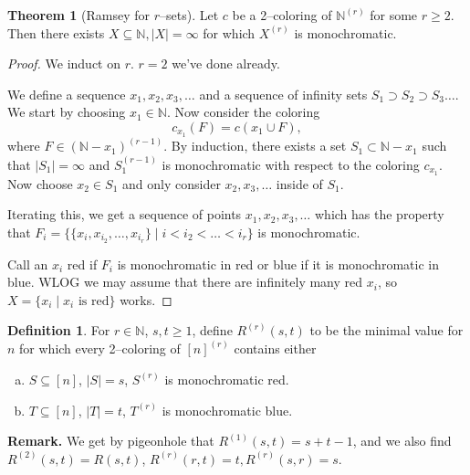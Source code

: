 \documentclass{article}
\theoremstyle{definition}
\newtheorem{theorem}{Theorem}[section]
\newtheorem{defn}{Definition}[section]
\begin{document}
\begin{theorem}[Ramsey for $r$--sets]
    Let $c$ be a 2--coloring of $\mathbb{N}^{(r)}$ for some $r\ge 2.$ Then there exists $X \subseteq \mathbb{N}, |X|=\infty$ for which $X^{(r)}$ is monochromatic.
\end{theorem}
\begin{proof}
    We induct on $r$. $r=2$ we've done already.
    \vspace{1mm}
    
    We define a sequence $x_1,x_2,x_3,\ldots$ and a sequence of infinity sets $S_1 \supset S_2 \supset S_3 \ldots$. We start by choosing $x_1 \in \mathbb{N}$. Now consider the coloring \[
    c_{x_1}(F)=c(x_1 \cup F),
    \] where $F \in (\mathbb{N}-x_1)^{(r-1)}$. By induction, there exists a set $S_1 \subset \mathbb{N}-x_1$ such that $|S_1|=\infty$ and $S_1^{(r-1)}$ is monochromatic with respect to the coloring $c_{x_1}$. Now choose $x_2 \in S_1$ and only consider $x_2,x_3,\ldots$ inside of $S_1$.

    Iterating this, we get a sequence of points $x_1,x_2,x_3,\ldots$ which has the property that $F_i = \{\{x_{i},x_{i_2},\ldots,x_{i_r}\} \mid i < i_2 < \ldots < i_r\}$ is monochromatic.

    Call an $x_i$ red if $F_i$ is monochromatic in red or blue if it is monochromatic in blue. WLOG we may assume that there are infinitely many red $x_i$, so $X = \{x_i \mid x_i \text{ is red}\}$ works.
\end{proof}
\begin{defn}
    For $r \in \mathbb{N}$, $s,t \ge 1$, define $R^{(r)}(s,t)$ to be the minimal value for $n$ for which every 2--coloring of $[n]^{(r)}$ contains either 
    \begin{enumerate}[(a)]
        \item $S \subseteq [n]$, $|S|=s$, $S^{(r)}$ is monochromatic red.
        \item $T \subseteq [n]$, $|T|=t$, $T^{(r)}$ is monochromatic blue.
    \end{enumerate}
\end{defn}
\textbf{Remark.} We get by pigeonhole that $R^{(1)}(s,t)=s+t-1$, and we also find $R^{(2)}(s,t)=R(s,t)$, $R^{(r)}(r,t)=t, R^{(r)}(s,r)=s$.
\end{document}
